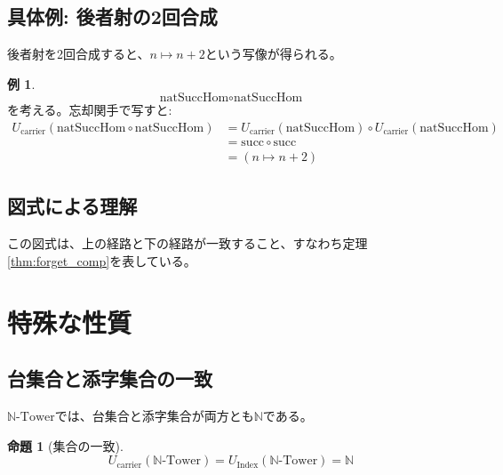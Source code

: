 \documentclass[a4paper,12pt]{article}
\theoremstyle{definition}
\newtheorem{proposition}[definition]{命題}
\newtheorem{example}[definition]{例}
\begin{document}
\subsection{具体例: 後者射の2回合成}

後者射を2回合成すると、$n \mapsto n + 2$という写像が得られる。

\begin{example}
\[
\text{natSuccHom} \circ \text{natSuccHom}
\]
を考える。忘却関手で写すと:
\begin{align*}
U_{\text{carrier}}(\text{natSuccHom} \circ \text{natSuccHom}) &= U_{\text{carrier}}(\text{natSuccHom}) \circ U_{\text{carrier}}(\text{natSuccHom}) \\
&= \text{succ} \circ \text{succ} \\
&= (n \mapsto n + 2)
\end{align*}
\end{example}

\subsection{図式による理解}

\begin{center}
\end{center}

この図式は、上の経路と下の経路が一致すること、すなわち定理\ref{thm:forget_comp}を表している。

\section{特殊な性質}

\subsection{台集合と添字集合の一致}

$\mathbb{N}\text{-Tower}$では、台集合と添字集合が両方とも$\mathbb{N}$である。

\begin{proposition}[集合の一致]
\[
U_{\text{carrier}}(\mathbb{N}\text{-Tower}) = U_{\text{Index}}(\mathbb{N}\text{-Tower}) = \mathbb{N}
\]
\end{proposition}
\end{document}
